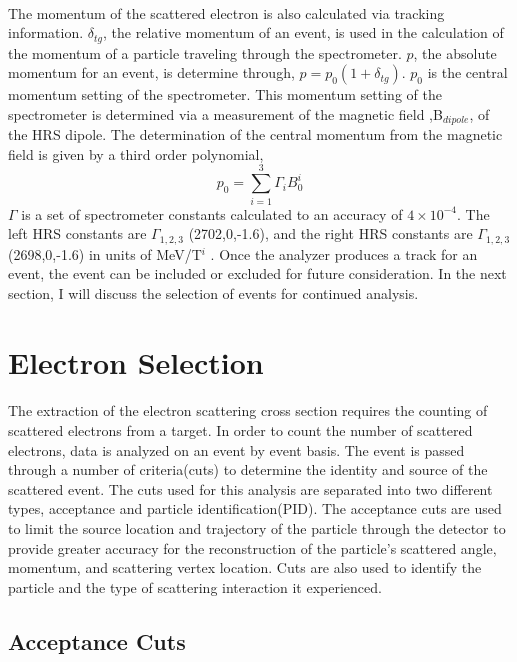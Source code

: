 \paragraph{}The momentum of the scattered electron is also calculated via tracking information.  $\delta_{tg}$, the relative momentum of an event, is used in the calculation of the momentum of a particle traveling through the spectrometer. $p$, the absolute momentum for an event, is determine through, $p = p_0(1+\delta_{tg})$. $p_0$ is the central momentum setting of the spectrometer. This momentum setting of the spectrometer is determined via a measurement of the magnetic field ,B$_{dipole}$, of the HRS dipole. The determination of the central momentum from the magnetic field is given by a third order polynomial,
\begin{equation}
p_0 = \sum_{i=1}^{3} \Gamma_iB_0^i
\end{equation}
$\Gamma$ is a set of spectrometer constants calculated to an accuracy of $4\times10^{-4}$. The left HRS constants are $\Gamma_{1,2,3}$ (2702,0,-1.6), and the right HRS constants are $\Gamma_{1,2,3}$ (2698,0,-1.6) in units of MeV/T$^i$ \cite{HallA}. Once the analyzer produces a track for an event, the event can be included or excluded for future consideration. In the next section, I will discuss the selection of events for continued analysis.
 
\section{Electron Selection}\label{sec:ES}
\paragraph{} The extraction of the electron scattering cross section requires the counting of scattered electrons from a target. In order to count the number of scattered electrons, data is analyzed on an event by event basis. The event is passed through a number of criteria(cuts) to determine the identity and source of the scattered event. The cuts used for this analysis are separated into two different types, acceptance and particle identification(PID). The acceptance cuts are used to limit the source location and trajectory of the particle through the detector to provide greater accuracy for the reconstruction of the particle's scattered angle, momentum, and scattering vertex location. Cuts are also used to identify the particle and the type of scattering interaction it experienced. 
\subsection{Acceptance Cuts}
